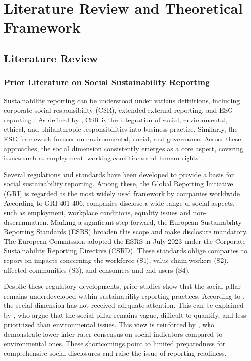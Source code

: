 \chapter{Literature Review and Theoretical Framework}
\label{chap:background}
\section{Literature Review}
\subsection{Prior Literature on Social Sustainability Reporting}

Sustainability reporting can be understood under various definitions, 
including corporate social responsibility (CSR), extended external reporting, 
and ESG reporting \parencite{Edge2022}. As defined by \parencite{Rasche2017}, CSR is the integration of social, 
environmental, ethical, and philanthropic responsibilities into business practice. 
Similarly, the ESG framework focuses on environmental, social, and governance. 
Across these approaches, the social dimension consistently emerges as a core aspect,
covering issues such as employment, working conditions and human rights \parencite{Fiechter2022, Morais2018}.

Several regulations and standards have been developed to provide a basis for social sustainability reporting.
Among these, the Global Reporting Initiative (GRI) is regarded as the most widely used framework 
by companies worldwide \parencite{Bais2024, vanOorschot2024}. 
According to GRI 401-406, companies disclose a wide range of social aspects, such as employment,
workplace conditions, equality issues and non-discrimination.
Marking a significant step forward, the European Sustainability Reporting Standards (ESRS) 
broaden this scope and make disclosure mandatory. The European Commission adopted the ESRS 
in July 2023 under the Corporate Sustainability Reporting Directive (CSRD). These standards 
oblige companies to report on impacts concerning the workforce (S1), value chain workers (S2), 
affected communities (S3), and consumers and end-users (S4).

Despite these regulatory developments, prior studies show that the social pillar remains underdeveloped 
within sustainability reporting practices. According to \textcite{Heldal2024}, the social dimension 
has not received adequate attention. This can be explained by \textcite{Morais2018}, 
who argue that the social pillar remains vague, difficult to quantify, and less prioritized than 
environmental issues. This view is reinforced by \textcite{Berg2022}, who demonstrate lower inter-rater 
consensus on social indicators compared to environmental ones. These shortcomings point to limited 
preparedness for comprehensive social disclosures and raise the issue of reporting readiness.

